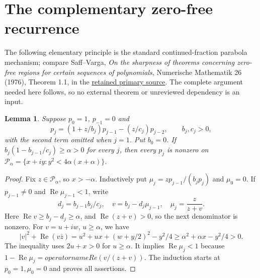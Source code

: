 \documentclass[11pt]{article}
\newtheorem{lemma}[theorem]{Lemma}
\begin{document}
\section{The complementary zero-free recurrence}
The following elementary principle is the standard continued-fraction
parabola mechanism; compare Saff--Varga, \emph{On the sharpness of
 theorems concerning zero-free regions for certain sequences of polynomials},
Numerische Mathematik 26 (1976), Theorem 1.1, in the
\href{sources/saff-varga-1976-sharpness.pdf}{retained primary source}.
The complete argument needed here follows, so no external theorem or
unreviewed dependency is an input.
\begin{lemma}\label{lem:outside}
Suppose $p_0=1$, $p_{-1}=0$ and
\[
 p_j=(1+z/b_j)p_{j-1}-(z/c_j)p_{j-2},\qquad b_j,c_j>0,
\]
with the second term omitted when $j=1$. Put $b_0=0$.
If $b_j(1-b_{j-1}/c_j)\ge\alpha>0$ for every $j$, then every $p_j$
is nonzero on $\mathcal P_\alpha=\{x+iy:y^2<4\alpha(x+\alpha)\}$.
\end{lemma}
\begin{proof}
Fix $z\in\mathcal P_\alpha$, so $x> -\alpha$.
Inductively put $\mu_j=zp_{j-1}/(b_jp_j)$ and $\mu_0=0$.
If $p_{j-1}\ne0$ and $\operatorname{Re}\mu_{j-1}<1$, write
\[
 d_j=b_{j-1}b_j/c_j,\quad v=b_j-d_j\mu_{j-1},\quad
                  \mu_j=\frac{z}{z+v}.
\]
Here $\operatorname{Re}v\ge b_j-d_j\ge\alpha$, and
$\operatorname{Re}(z+v)>0$, so the next denominator is nonzero.
For $v=u+iw$, $u\ge\alpha$, we have
\[
 |v|^2+\operatorname{Re}(v\overline z)
 =u^2+ux+(w+y/2)^2-y^2/4
 \ge\alpha^2+\alpha x-y^2/4>0.                              \tag{7}
\]
The inequality uses $2u+x>0$ for $u\ge\alpha$.
It implies $\operatorname{Re}\mu_j<1$ because
$1-\operatorname{Re}\mu_j=operatorname{Re}(v/(z+v))$.
The induction starts at $p_0=1,\mu_0=0$ and proves all assertions.
\end{proof}
\end{document}

